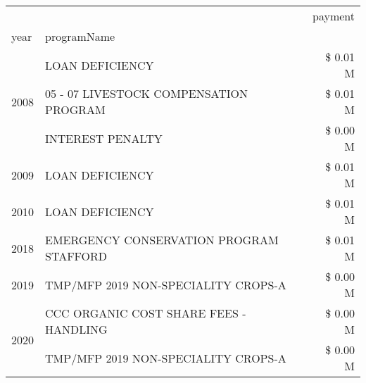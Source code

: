 \begin{tabular}{llr}
\toprule
 &  & payment \\
year & programName &  \\
\midrule
\multirow[t]{3}{*}{2008} & LOAN DEFICIENCY & \$ 0.01 M \\
 & 05 - 07 LIVESTOCK COMPENSATION PROGRAM & \$ 0.01 M \\
 & INTEREST PENALTY & \$ 0.00 M \\
\cline{1-3}
2009 & LOAN DEFICIENCY & \$ 0.01 M \\
\cline{1-3}
2010 & LOAN DEFICIENCY & \$ 0.01 M \\
\cline{1-3}
2018 & EMERGENCY CONSERVATION PROGRAM STAFFORD & \$ 0.01 M \\
\cline{1-3}
2019 & TMP/MFP 2019 NON-SPECIALITY CROPS-A & \$ 0.00 M \\
\cline{1-3}
\multirow[t]{2}{*}{2020} & CCC ORGANIC COST SHARE FEES - HANDLING & \$ 0.00 M \\
 & TMP/MFP 2019 NON-SPECIALITY CROPS-A & \$ 0.00 M \\
\cline{1-3}
\bottomrule
\end{tabular}
